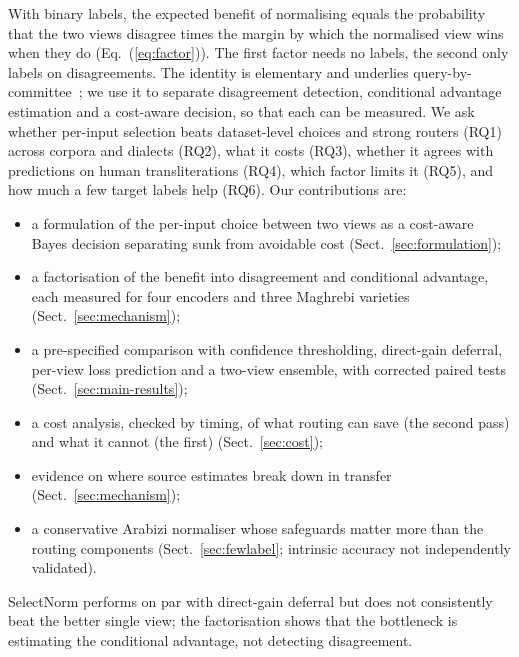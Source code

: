 With binary labels, the expected benefit of normalising equals the probability that the two views disagree times the margin by which the normalised view wins when they do (Eq.~(\ref{eq:factor})). The first factor needs no labels, the second only labels on disagreements. The identity is elementary and underlies query-by-committee~\cite{seung1992qbc}; we use it to separate disagreement detection, conditional advantage estimation and a cost-aware decision, so that each can be measured. We ask whether per-input selection beats dataset-level choices and strong routers (RQ1) across corpora and dialects (RQ2), what it costs (RQ3), whether it agrees with predictions on human transliterations (RQ4), which factor limits it (RQ5), and how much a few target labels help (RQ6). Our contributions are:
\begin{itemize}[leftmargin=1.2em,itemsep=0pt,topsep=2pt]
\item a formulation of the per-input choice between two views as a cost-aware Bayes decision separating sunk from avoidable cost (Sect.~\ref{sec:formulation});
\item a factorisation of the benefit into disagreement and conditional advantage, each measured for four encoders and three Maghrebi varieties (Sect.~\ref{sec:mechanism});
\item a pre-specified comparison with confidence thresholding, direct-gain deferral, per-view loss prediction and a two-view ensemble, with corrected paired tests (Sect.~\ref{sec:main-results});
\item a cost analysis, checked by timing, of what routing can save (the second pass) and what it cannot (the first) (Sect.~\ref{sec:cost});
\item evidence on where source estimates break down in transfer (Sect.~\ref{sec:mechanism});
\item a conservative Arabizi normaliser whose safeguards matter more than the routing components (Sect.~\ref{sec:fewlabel}; intrinsic accuracy not independently validated).
\end{itemize}
SelectNorm performs on par with direct-gain deferral but does not consistently beat the better single view; the factorisation shows that the bottleneck is estimating the conditional advantage, not detecting disagreement.
